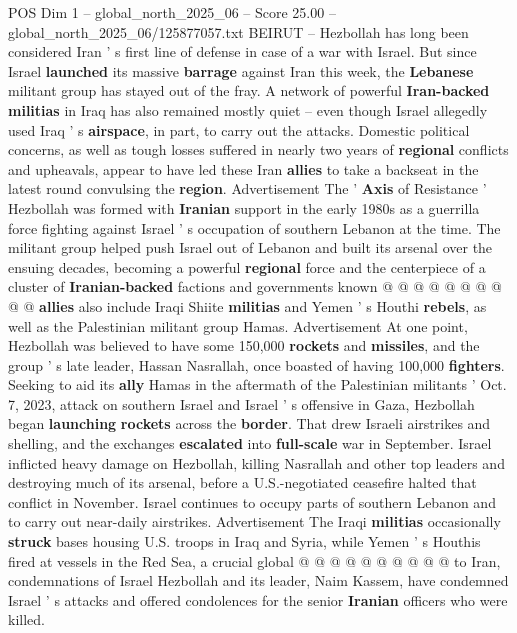 \begin{textsample}{POS Dim 1 – global\_north\_2025\_06 – Score 25.00 – global\_north\_2025\_06/125877057.txt}  \label{ex:f1_pos_332}
BEIRUT -- Hezbollah has long been considered Iran ' s first line of defense in case of a war with Israel.
But since Israel \textbf{launched} its massive \textbf{barrage} against Iran this week, the \textbf{Lebanese} militant group has stayed out of the fray.
A network of powerful \textbf{Iran-backed} \textbf{militias} in Iraq has also remained mostly quiet -- even though Israel allegedly used Iraq ' s \textbf{airspace}, in part, to carry out the attacks.
Domestic political concerns, as well as tough losses suffered in nearly two years of \textbf{regional} conflicts and upheavals, appear to have led these Iran \textbf{allies} to take a backseat in the latest round convulsing the \textbf{region}.
Advertisement The ' \textbf{Axis} of Resistance ' Hezbollah was formed with \textbf{Iranian} support in the early 1980s as a guerrilla force fighting against Israel ' s occupation of southern Lebanon at the time.
The militant group helped push Israel out of Lebanon and built its arsenal over the ensuing decades, becoming a powerful \textbf{regional} force and the centerpiece of a cluster of \textbf{Iranian-backed} factions and governments known @ @ @ @ @ @ @ @ @ @ \textbf{allies} also include Iraqi Shiite \textbf{militias} and Yemen ' s Houthi \textbf{rebels}, as well as the Palestinian militant group Hamas.
Advertisement At one point, Hezbollah was believed to have some 150,000 \textbf{rockets} and \textbf{missiles}, and the group ' s late leader, Hassan Nasrallah, once boasted of having 100,000 \textbf{fighters}.
Seeking to aid its \textbf{ally} Hamas in the aftermath of the Palestinian militants ' Oct. 7, 2023, attack on southern Israel and Israel ' s offensive in Gaza, Hezbollah began \textbf{launching} \textbf{rockets} across the \textbf{border}.
That drew Israeli airstrikes and shelling, and the exchanges \textbf{escalated} into \textbf{full-scale} war in September.
Israel inflicted heavy damage on Hezbollah, killing Nasrallah and other top leaders and destroying much of its arsenal, before a U.S.-negotiated ceasefire halted that conflict in November.
Israel continues to occupy parts of southern Lebanon and to carry out near-daily airstrikes.
Advertisement The Iraqi \textbf{militias} occasionally \textbf{struck} bases housing U.S. troops in Iraq and Syria, while Yemen ' s Houthis fired at vessels in the Red Sea, a crucial global @ @ @ @ @ @ @ @ @ @ to Iran, condemnations of Israel Hezbollah and its leader, Naim Kassem, have condemned Israel ' s attacks and offered condolences for the senior \textbf{Iranian} officers who were killed.

\end{textsample}
